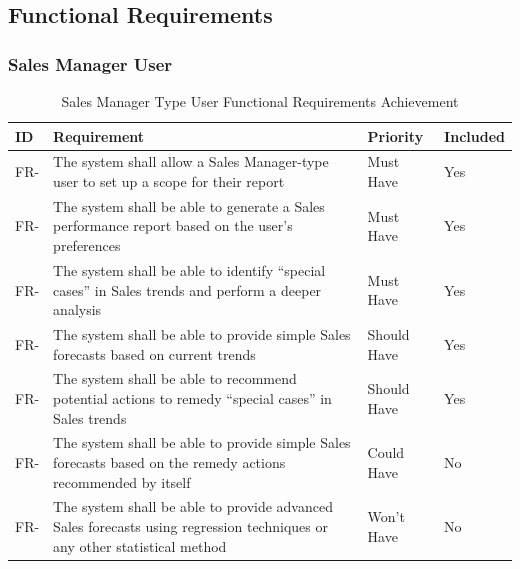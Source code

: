 \documentclass[a4paper]{report}
\begin{document}

\newcommand{\rfrid}{FR-\arabic{ref-frcounter}}
\newcommand{\rnfrid}{NFR-\arabic{ref-nfrcounter}}

\subsection{Functional Requirements}

\subsubsection{Sales Manager User}

\begin{table}[H]
    \centering
    \begin{tabular}{|l|p{8cm}|l|l|}
        \hline
        \textbf{ID} & \textbf{Requirement} & \textbf{Priority} & \textbf{Included} \\
        \hline
        \stepcounter{ref-frcounter}\rfrid & The system shall allow a Sales Manager-type user to set up a scope for their report & Must Have & Yes \\ \hline
        \stepcounter{ref-frcounter}\rfrid & The system shall be able to generate a Sales performance report based on the user’s preferences & Must Have & Yes \\ \hline
        \stepcounter{ref-frcounter}\rfrid & The system shall be able to identify “special cases” in Sales trends and perform a deeper analysis & Must Have & Yes \\ \hline
        \stepcounter{ref-frcounter}\rfrid & The system shall be able to provide simple Sales forecasts based on current trends & Should Have & Yes \\ \hline
        \stepcounter{ref-frcounter}\rfrid & The system shall be able to recommend potential actions to remedy “special cases” in Sales trends & Should Have & Yes \\ \hline
        \stepcounter{ref-frcounter}\rfrid & The system shall be able to provide simple Sales forecasts based on the remedy actions recommended by itself & Could Have & No \\ \hline
        \stepcounter{ref-frcounter}\rfrid & The system shall be able to provide advanced Sales forecasts using regression techniques or any other statistical method & Won’t Have & No \\
        \hline
    \end{tabular}
\caption{Sales Manager Type User Functional Requirements Achievement}
\end{table}
\end{document}
